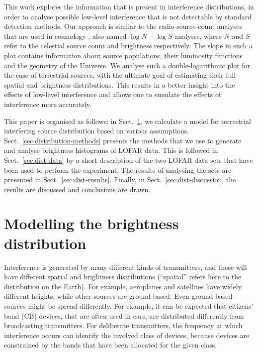 \documentclass[useAMS,usenatbib]{mn2e}
\begin{document}
This work explores the information that is present in interference distributions, in order to analyse possible low-level interference that is not detectable by standard detection methods. Our approach is similar to the radio-source-count analyses that are used in cosmology \citep{condon-cosm-evol-of-radio-sources}, also named $\log N$ -- $\log S$ analyses, where $N$ and $S$ refer to the celestial source count and brightness respectively. The slope in such a plot contains information about source populations, their luminosity functions and the geometry of the Universe. We analyse such a double-logarithmic plot for the case of terrestrial sources, with the ultimate goal of estimating their full spatial and brightness distributions. This results in a better insight into the effects of low-level interference and allows one to simulate the effects of interference more accurately.


This paper is organised as follows: in Sect.~\ref{sec:distribution-prediction}, we calculate a model for terrestrial interfering source distribution based on various assumptions. Sect.~\ref{sec:distribution-methods} presents the methods that we use to generate and analyse brightness histograms of LOFAR data. This is followed in Sect.~\ref{sec:dist-data} by a short description of the two LOFAR data sets that have been used to perform the experiment. The results of analysing the sets are presented in Sect.~\ref{sec:dist-results}. Finally, in Sect.~\ref{sec:dist-discussion} the results are discussed and conclusions are drawn.

\section{Modelling the brightness distribution} \label{sec:distribution-prediction}
Interference is generated by many different kinds of transmitters, and these will have different spatial and brightness distributions (``spatial'' refers here to the distribution on the Earth). For example, aeroplanes and satellites have widely different heights, while other sources are ground-based. Even ground-based sources might be spread differently. For example, it can be expected that citizens' band (CB) devices, that are often used in cars, are distributed differently from broadcasting transmitters. For deliberate transmitters, the frequency at which interference occurs can identify the involved class of devices, because devices are constrained by the bands that have been allocated for the given class.
\end{document}
